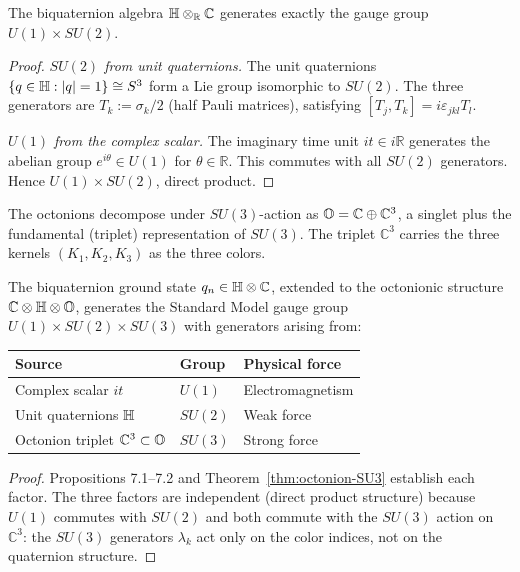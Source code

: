 \begin{proposition}
\label{prop:biquaternion-u1su2}
The biquaternion algebra $\mathbb{H}\otimes_{\mathbb{R}}\mathbb{C}$ generates
exactly the gauge group $U(1)\times SU(2)$.
\end{proposition}

\begin{proof}
\emph{$SU(2)$ from unit quaternions.}
The unit quaternions $\{q\in\mathbb{H}:|q|=1\}\cong S^3$ form a Lie group
isomorphic to $SU(2)$.
The three generators are $T_k:=\sigma_k/2$ (half Pauli matrices),
satisfying $[T_j,T_k]=i\varepsilon_{jkl}T_l$.

\emph{$U(1)$ from the complex scalar.}
The imaginary time unit $it\in i\mathbb{R}$ generates the abelian group
$e^{i\theta}\in U(1)$ for $\theta\in\mathbb{R}$.
This commutes with all $SU(2)$ generators.
Hence $U(1)\times SU(2)$, direct product.
\end{proof}

\begin{theorem}[$\OO\to SU(3)$]\label{thm:octonion-SU3}
The octonions decompose under $SU(3)$-action as
$\mathbb{O} = \mathbb{C}\oplus\mathbb{C}^3$,
a singlet plus the fundamental (triplet) representation of $SU(3)$.
The triplet $\mathbb{C}^3$ carries the three kernels $(K_1,K_2,K_3)$
as the three colors.
\end{theorem}

\begin{theorem}\label{thm:SM}
The biquaternion ground state $q_n\in\mathbb{H}\otimes\mathbb{C}$, extended to
the octonionic structure $\mathbb{C}\otimes\mathbb{H}\otimes\mathbb{O}$, generates
the Standard Model gauge group $U(1)\times SU(2)\times SU(3)$ with
generators arising from:
\begin{center}
\renewcommand{\arraystretch}{1.3}
\begin{tabular}{lll}
\toprule
Source & Group & Physical force\\
\midrule
Complex scalar $it$ & $U(1)$ & Electromagnetism\\
Unit quaternions $\mathbb{H}$ & $SU(2)$ & Weak force\\
Octonion triplet $\mathbb{C}^3\subset\mathbb{O}$ & $SU(3)$ & Strong force\\
\bottomrule
\end{tabular}
\end{center}
\end{theorem}

\begin{proof}
Propositions 7.1--7.2 and Theorem~\ref{thm:octonion-SU3} establish each
factor.
The three factors are independent (direct product structure) because
$U(1)$ commutes with $SU(2)$ and both commute with the $SU(3)$ action
on $\mathbb{C}^3$: the $SU(3)$ generators $\lambda_k$ act only on the
color indices, not on the quaternion structure.
\end{proof}

